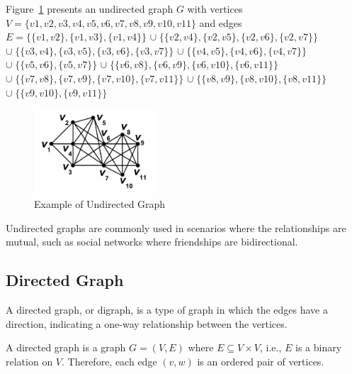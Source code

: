 \begin{myex}
    Figure~\ref{fig:example-undirected-graph} presents an undirected graph $G$ with vertices $V = \{v1, v2, v3, v4, v5, v6, v7, v8, v9, v10, v11\}$ and edges \\
    $E= \{\{v1, v2\}, \{v1, v3\}, \{v1, v4\}\}$
    $\cup \; \{\{v2, v4\}, \{v2, v5\}, \{v2, v6\}, \{v2, v7\}\}$ \\
    $\cup \; \{\{v3, v4\}, \{v3, v5\}, \{v3, v6\}, \{v3, v7\}\}$
    $\cup \; \{\{v4, v5\}, \{v4, v6\}, \{v4, v7\}\}$
    $\cup \; \{\{v5, v6\}, \{v5, v7\}\}$
    $\cup \; \{\{v6, v8\}, \{v6, v9\}, \{v6, v10\}, \{v6, v11\}\}$
    $\cup \; \{\{v7, v8\}, \{v7, v9\}, \{v7, v10\}, \{v7, v11\}\}$
    $\cup \; \{\{v8, v9\}, \{v8, v10\}, \{v8, v11\}\}$
    $\cup \; \{\{v9, v10\}, \{v9, v11\}\}$

    \begin{figure}[!h]
        \centering
        \includegraphics[width=0.40\textwidth]{images/graphs/undirected_graph_wikipedia}
        \caption{Example of Undirected Graph}
        \label{fig:example-undirected-graph}
    \end{figure}
\end{myex}

Undirected graphs are commonly used in scenarios where the relationships are mutual, such as social networks where friendships are bidirectional.

\subsection*{Directed Graph}\label{subsec:directed-graph}

A directed graph, or digraph, is a type of graph in which the edges have a direction, indicating a one-way relationship between the vertices.

A directed graph is a graph $G = (V, E)$ where $E \subseteq V \times V$, i.e., $E$ is a binary relation on $V$.
Therefore, each edge $(v, w)$ is an ordered pair of vertices.

